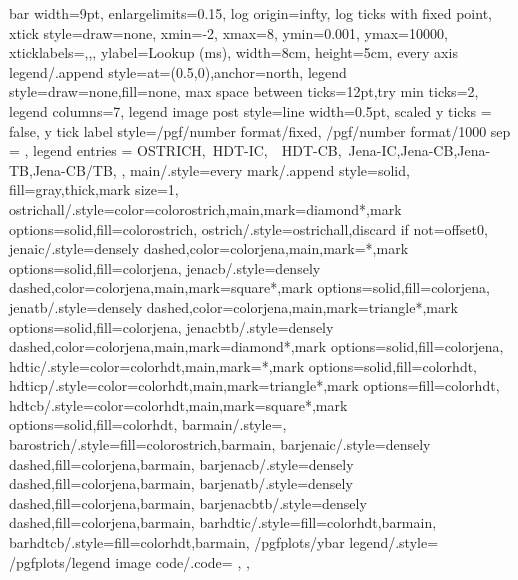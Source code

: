 {{      bar width=9pt,
      enlargelimits=0.15,
      log origin=infty,
      log ticks with fixed point,
      xtick style={draw=none},
      xmin=-2,
      xmax=8,
      ymin=0.001,
      ymax=10000,
      xticklabels={,,},
      ylabel={Lookup (ms)},
      width=8cm,
      height=5cm,
      every axis legend/.append style={at={(0.5,0)},anchor=north},
      legend style={draw=none,fill=none},
      max space between ticks=12pt,try min ticks=2,
      legend columns=7,
      legend image post style={line width=0.5pt},
      scaled y ticks = false,
      y tick label style={/pgf/number format/fixed, /pgf/number format/1000 sep = \thinspace},
      legend entries = {OSTRICH,\ HDT-IC,\ \ HDT-CB,\ Jena-IC,Jena-CB,Jena-TB,Jena-CB/TB,}
  },
  main/.style={every mark/.append style={solid, fill=gray},thick,mark size=1},
  ostrichall/.style={color=colorostrich,main,mark=diamond*,mark options={solid,fill=colorostrich}},
  ostrich/.style={ostrichall,discard if not={offset}{0}},
  jenaic/.style={densely dashed,color=colorjena,main,mark=*,mark options={solid,fill=colorjena}},
  jenacb/.style={densely dashed,color=colorjena,main,mark=square*,mark options={solid,fill=colorjena}},
  jenatb/.style={densely dashed,color=colorjena,main,mark=triangle*,mark options={solid,fill=colorjena}},
  jenacbtb/.style={densely dashed,color=colorjena,main,mark=diamond*,mark options={solid,fill=colorjena}},
  hdtic/.style={color=colorhdt,main,mark=*,mark options={solid,fill=colorhdt}},
  hdticp/.style={color=colorhdt,main,mark=triangle*,mark options={fill=colorhdt}},
  hdtcb/.style={color=colorhdt,main,mark=square*,mark options={solid,fill=colorhdt}},
  barmain/.style={},
  barostrich/.style={fill=colorostrich,barmain},
  barjenaic/.style={densely dashed,fill=colorjena,barmain},
  barjenacb/.style={densely dashed,fill=colorjena,barmain},
  barjenatb/.style={densely dashed,fill=colorjena,barmain},
  barjenacbtb/.style={densely dashed,fill=colorjena,barmain},
  barhdtic/.style={fill=colorhdt,barmain},
  barhdtcb/.style={fill=colorhdt,barmain},
  /pgfplots/ybar legend/.style={
      /pgfplots/legend image code/.code={%
         },
  },
}
